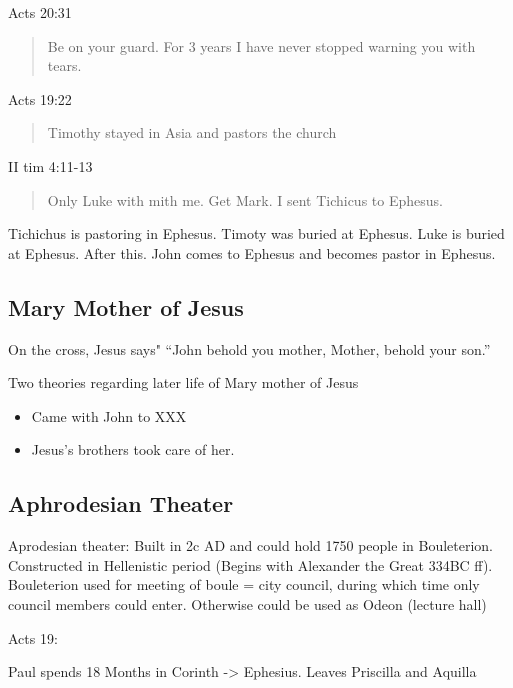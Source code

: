 \documentclass[
]{book}
\providecommand{\tightlist}{%
  \setlength{\itemsep}{0pt}\setlength{\parskip}{0pt}}
\begin{document}
Acts 20:31

\begin{quote}
Be on your guard. For 3 years I have never stopped warning you with tears.
\end{quote}

Acts 19:22

\begin{quote}
Timothy stayed in Asia and pastors the church
\end{quote}

II tim 4:11-13

\begin{quote}
Only Luke with mith me. Get Mark. I sent Tichicus to Ephesus.
\end{quote}

Tichichus is pastoring in Ephesus. Timoty was buried at Ephesus. Luke is buried at Ephesus. After this. John comes to Ephesus and becomes pastor in Ephesus.

\hypertarget{mary-mother-of-jesus}{%
\subsection{Mary Mother of Jesus}\label{mary-mother-of-jesus}}

On the cross, Jesus says" ``John behold you mother, Mother, behold your son.''

Two theories regarding later life of Mary mother of Jesus

\begin{itemize}
\tightlist
\item
  Came with John to XXX
\item
  Jesus's brothers took care of her.
\end{itemize}

\hypertarget{aphrodesian-theater}{%
\subsection{Aphrodesian Theater}\label{aphrodesian-theater}}

Aprodesian theater: Built in 2c AD and could hold 1750 people in Bouleterion. Constructed in Hellenistic period (Begins with Alexander the Great 334BC ff). Bouleterion used for meeting of boule = city council, during which time only council members could enter. Otherwise could be used as Odeon (lecture hall)

Acts 19:

Paul spends 18 Months in Corinth -\textgreater{} Ephesius. Leaves Priscilla and Aquilla
\end{document}
